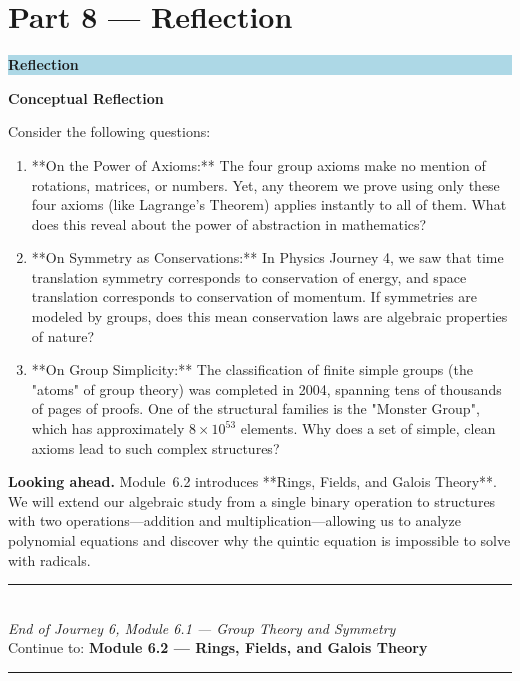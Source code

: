 \documentclass[12pt, a4paper]{article}
\newenvironment{reflectionbox}
  {\par\medskip\fillcolorbox{LightBlue}{ReflectColor}{Reflection}}
  {\par\medskip}
\newcommand{\fillcolorbox}[3]{%
  \noindent
  \filldrawbox{#1}{#2}{\textbf{\sffamily\color{white}#3}}\par\nobreak\vspace{4pt}
}
\newcommand{\filldrawbox}[3]{%
  \colorbox{#1}{\parbox{\dimexpr\linewidth-2\fboxsep\relax}{%
    \vspace{4pt}\noindent\hspace{4pt}#3\vspace{4pt}%
  }}%
}
\begin{document}
\newpage

\section{Part 8 --- Reflection}

\begin{reflectionbox}
\textbf{Conceptual Reflection}

Consider the following questions:
\begin{enumerate}
  \item **On the Power of Axioms:** The four group axioms make no mention of rotations, matrices, or numbers. Yet, any theorem we prove using only these four axioms (like Lagrange's Theorem) applies instantly to all of them. What does this reveal about the power of abstraction in mathematics?
  \item **On Symmetry as Conservations:** In Physics Journey 4, we saw that time translation symmetry corresponds to conservation of energy, and space translation corresponds to conservation of momentum. If symmetries are modeled by groups, does this mean conservation laws are algebraic properties of nature?
  \item **On Group Simplicity:** The classification of finite simple groups (the "atoms" of group theory) was completed in 2004, spanning tens of thousands of pages of proofs. One of the structural families is the "Monster Group", which has approximately $8 \times 10^{53}$ elements. Why does a set of simple, clean axioms lead to such complex structures?
\end{enumerate}
\end{reflectionbox}

\medskip
\noindent\textbf{Looking ahead.}
Module~6.2 introduces **Rings, Fields, and Galois Theory**. We will extend our algebraic study from a single binary operation to structures with two operations—addition and multiplication—allowing us to analyze polynomial equations and discover why the quintic equation is impossible to solve with radicals.

\vspace{1.4cm}
\begin{center}
{\color{NavyBlue}\rule{0.5\linewidth}{0.8pt}}\\[6pt]
{\small\color{NavyBlue}\textit{End of Journey 6, Module 6.1 --- Group Theory and Symmetry}}\\[4pt]
{\small\color{NavyBlue}Continue to: \textbf{Module 6.2 --- Rings, Fields, and Galois Theory}}\\[6pt]
{\color{NavyBlue}\rule{0.5\linewidth}{0.8pt}}
\end{center}
\end{document}
